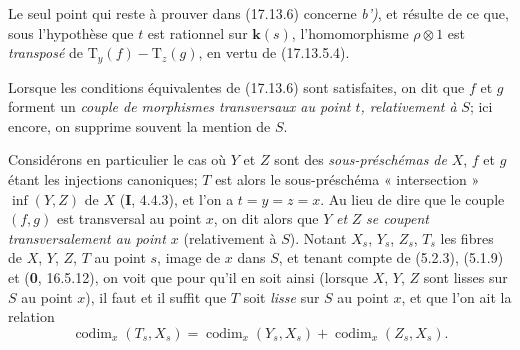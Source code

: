 Le seul point qui reste à prouver dans (17.13.6) concerne \emph{b')}, et résulte de ce que, sous l'hypothèse que $t$ est rationnel sur $\boldsymbol{k}(s)$, l'homomorphisme $\rho\otimes1$ est \emph{transposé} de $\mathrm{T}_y(f)-\mathrm{T}_z(g)$, en vertu de (17.13.5.4).

Lorsque les conditions équivalentes de (17.13.6) sont satisfaites, on dit que $f$ et $g$ forment un \emph{couple de morphismes transversaux au point $t$, relativement à} $S$; ici encore, on supprime souvent la mention de $S$.

\begin{env}[17.13.7]
Considérons en particulier le cas où $Y$ et $Z$ sont des \emph{sous-préschémas de} $X$, $f$ et $g$ étant les injections canoniques; $T$ est alors le sous-préschéma « intersection »
$\inf(Y,Z)$ de $X$ (\textbf{I}, 4.4.3), et l'on a $t=y=z=x$. Au lieu de dire que le couple $(f,g)$ est transversal au point $x$, on dit alors que $Y$ \emph{et} $Z$ \emph{se coupent transversalement au point $x$} (relativement à $S$). Notant $X_s$, $Y_s$, $Z_s$, $T_s$ les fibres de $X$, $Y$, $Z$, $T$ au point $s$, image de $x$ dans $S$, et tenant compte de (5.2.3), (5.1.9) et (\textbf{0}, 16.5.12), on voit que pour qu'il en soit ainsi (lorsque $X$, $Y$, $Z$ sont lisses sur $S$ au point $x$), il faut et il suffit que $T$ soit \emph{lisse} sur $S$ au point $x$, et que l'on ait la relation
\[
\label{IV.17.13.7.1}
\tag{17.13.7.1}
\operatorname{codim}_x(T_s,X_s)=\operatorname{codim}_x(Y_s,X_s)+\operatorname{codim}_x(Z_s,X_s).
\]
\end{env}

